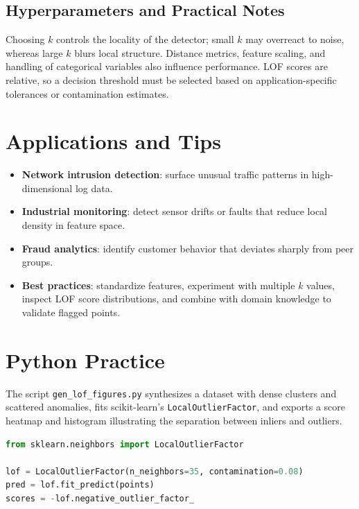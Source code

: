 ﻿\documentclass[12pt]{article}
\begin{document}
\subsection{Hyperparameters and Practical Notes}
Choosing \(k\) controls the locality of the detector; small \(k\) may overreact to noise, whereas large \(k\) blurs local structure. Distance metrics, feature scaling, and handling of categorical variables also influence performance. LOF scores are relative, so a decision threshold must be selected based on application-specific tolerances or contamination estimates.

\section{Applications and Tips}
\begin{itemize}
  \item \textbf{Network intrusion detection}: surface unusual traffic patterns in high-dimensional log data.
  \item \textbf{Industrial monitoring}: detect sensor drifts or faults that reduce local density in feature space.
  \item \textbf{Fraud analytics}: identify customer behavior that deviates sharply from peer groups.
  \item \textbf{Best practices}: standardize features, experiment with multiple \(k\) values, inspect LOF score distributions, and combine with domain knowledge to validate flagged points.
\end{itemize}

\section{Python Practice}
The script \texttt{gen\_lof\_figures.py} synthesizes a dataset with dense clusters and scattered anomalies, fits scikit-learn's \texttt{LocalOutlierFactor}, and exports a score heatmap and histogram illustrating the separation between inliers and outliers.
\begin{lstlisting}[language=Python,caption={Excerpt from gen_lof_figures.py}]
from sklearn.neighbors import LocalOutlierFactor

lof = LocalOutlierFactor(n_neighbors=35, contamination=0.08)
pred = lof.fit_predict(points)
scores = -lof.negative_outlier_factor_
\end{lstlisting}
\end{document}
